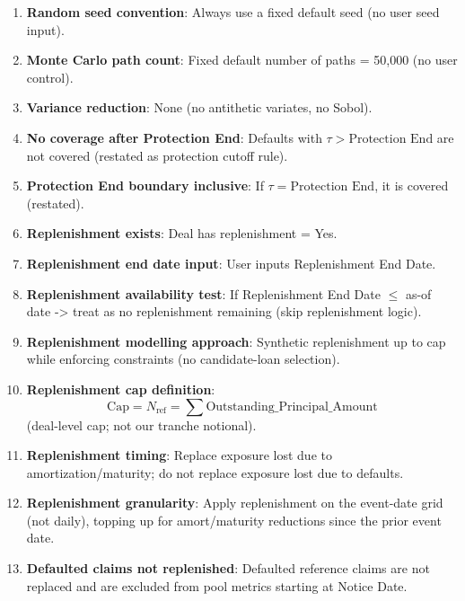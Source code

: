 \documentclass[11pt]{article}
\begin{document}
\begin{enumerate}[label=\arabic*),leftmargin=*,align=left]
\item \textbf{Random seed convention}: Always use a fixed default seed (no user seed input).

\item \textbf{Monte Carlo path count}: Fixed default number of paths = 50,000 (no user control).

\item \textbf{Variance reduction}: None (no antithetic variates, no Sobol).

\item \textbf{No coverage after Protection End}: Defaults with $\tau > \text{Protection End}$ are not covered (restated as protection cutoff rule).

\item \textbf{Protection End boundary inclusive}: If $\tau = \text{Protection End}$, it is covered (restated).

\item \textbf{Replenishment exists}: Deal has replenishment = Yes.

\item \textbf{Replenishment end date input}: User inputs Replenishment End Date.

\item \textbf{Replenishment availability test}: If Replenishment End Date $\le$ as-of date -> treat as no replenishment remaining (skip replenishment logic).

\item \textbf{Replenishment modelling approach}: Synthetic replenishment up to cap while enforcing constraints (no candidate-loan selection).

\item \textbf{Replenishment cap definition}: 
\[ \text{Cap} = N_{\text{ref}} = \sum \text{Outstanding\_Principal\_Amount} \]
(deal-level cap; not our tranche notional).

\item \textbf{Replenishment timing}: Replace exposure lost due to amortization/maturity; do not replace exposure lost due to defaults.

\item \textbf{Replenishment granularity}: Apply replenishment on the event-date grid (not daily), topping up for amort/maturity reductions since the prior event date.

\item \textbf{Defaulted claims not replenished}: Defaulted reference claims are not replaced and are excluded from pool metrics starting at Notice Date.


\end{enumerate}
\end{document}
